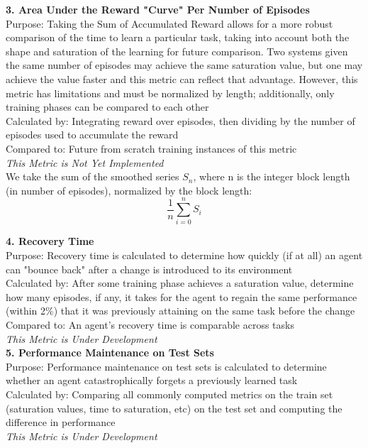 \textbf{3. Area Under the Reward "Curve" Per Number of Episodes}\\
Purpose: Taking the Sum of Accumulated Reward allows for a more robust comparison of the time to learn a particular task, taking into account both the shape and saturation of the learning for future comparison. Two systems given the same number of episodes may achieve the same saturation value, but one may achieve the value faster and this metric can reflect that advantage. However,  this metric has limitations and must be normalized by length; additionally, only training phases can be compared to each other\\
Calculated by: Integrating reward over episodes, then dividing by the number of episodes used to accumulate the reward\\
Compared to: Future from scratch training instances of this metric\\
\textit{This Metric is Not Yet Implemented}\\[0.1in]

We take the sum of the smoothed series \begin{math}S_n\end{math}, where n is the integer block length (in number of episodes), normalized by the block length:\\[0.1in]

\[\frac{1}{n}\sum_{i=0}^{n} {S_i}\]

\textbf{4. Recovery Time}\\
Purpose: Recovery time is calculated to determine how quickly (if at all) an agent can "bounce back" after a change is introduced to its environment\\
Calculated by: After some training phase achieves a saturation value, determine how many episodes, if any, it takes for the agent to regain the same performance (within 2\%) that it was previously attaining on the same task before the change\\
Compared to: An agent's recovery time is comparable across tasks\\
\textit{This Metric is Under Development}\\[0.1in]

\textbf{5. Performance Maintenance on Test Sets}\\
Purpose: Performance maintenance on test sets is calculated to determine whether an agent catastrophically forgets a previously learned task\\
Calculated by: Comparing all commonly computed metrics on the train set (saturation values, time to saturation, etc) on the test set and computing the difference in performance\\
\textit{This Metric is Under Development}\\[0.1in]

